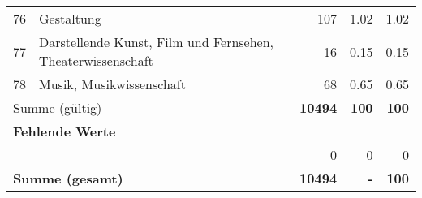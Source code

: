 \begin{longtable}{lXrrr}
        76 & \multicolumn{1}{X}{Gestaltung} & %
          \num{107} &
          \num[round-mode=places,round-precision=2]{1,02} &
          \num[round-mode=places,round-precision=2]{1,02} \\

        77 & \multicolumn{1}{X}{Darstellende Kunst, Film und Fernsehen, Theaterwissenschaft} & %
          \num{16} &
          \num[round-mode=places,round-precision=2]{0,15} &
          \num[round-mode=places,round-precision=2]{0,15} \\

        78 & \multicolumn{1}{X}{Musik, Musikwissenschaft} & %
          \num{68} &
          \num[round-mode=places,round-precision=2]{0,65} &
          \num[round-mode=places,round-precision=2]{0,65} \\

     \midrule
     \multicolumn{2}{l}{Summe (gültig)} &
       \textbf{\num{10494}} &
     \textbf{100} &
       \textbf{\num[round-mode=places,round-precision=2]{100}} \\
     \multicolumn{5}{l}{\textbf{Fehlende Werte}}\\
      & & 0 & 0 & 0 \\
     \midrule
     \multicolumn{2}{l}{\textbf{Summe (gesamt)}} &
          \textbf{\num{10494}} &
        \textbf{-} &
        \textbf{100} \\
     \bottomrule
     \end{longtable}
     
